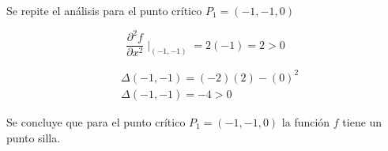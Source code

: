 Se repite el análisis para el punto crítico $P_1=(-1,-1,0)$

\begin{equation*}
	\frac{\partial^2 f}{\partial x^2}\mid_{(-1,-1)}=2(-1)=2>0
\end{equation*}

\begin{align*}
	 & \Delta(-1,-1)=(-2)(2)-(0)^2 \\
	 & \Delta(-1,-1)=-4>0
\end{align*}

Se concluye que para el punto crítico $P_1=(-1,-1,0)$ la función $f$
tiene un punto silla.


